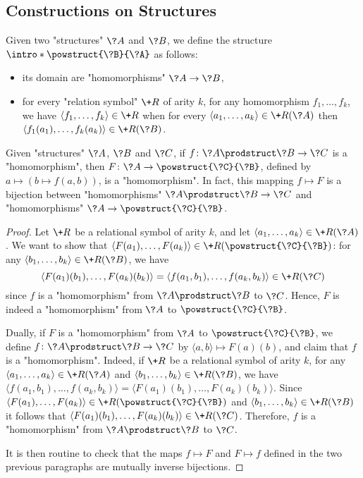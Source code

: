 \subsection{Constructions on Structures}

Given two "structures" $\?A$ and $\?B$, we define the structure \AP$\intro*\powstruct{\?B}{\?A}$ as follows:
\begin{itemize}
  \item its domain are "homomorphisms" $\?A \to \?B$,
  \item for every "relation symbol" $\+R$ of arity $k$, for any homomorphism $f_1,\hdots,f_k$,
  we have $\langle f_1,\hdots,f_k\rangle \in \+R$ when for every
  $\langle a_1,\hdots,a_k\rangle \in \+R(\?A)$
  then $\langle f_1(a_1), \hdots, f_k(a_k) \rangle \in \+R(\?B)$.
\end{itemize}


\begin{proposition}
	\AP\label{prop:currying-hom}
	Given "structures" $\?A$, $\?B$ and $\?C$, if $f\colon \?A\prodstruct \?B \to \?C$
	is a "homomorphism", then $F\colon \?A \to \powstruct{\?C}{\?B}$,
	defined by $a \mapsto (b \mapsto f(a,b))$, is a "homomorphism".
	In fact, this mapping $f \mapsto F$ is a bijection
	between "homomorphisms" $\?A\prodstruct \?B \to \?C$
	and "homomorphisms" $\?A \to \powstruct{\?C}{\?B}$.
\end{proposition}

\begin{proof}
Let $\+R$ be a relational symbol of arity $k$, and let
$\langle a_1,\hdots,a_k \rangle \in \+R(\?A)$.
We want to show that $\langle F(a_1),\hdots,F(a_k) \rangle \in \+R(\powstruct{\?C}{\?B})$:
for any $\langle b_1,\hdots,b_k \rangle \in \+R(\?B)$, we have
\[\langle F(a_1)(b_1), \hdots, F(a_k)(b_k)\rangle = \langle f(a_1,b_1),\hdots,f(a_k,b_k) \rangle \in \+R(\?C)\] since $f$ is a "homomorphism" from $\?A\prodstruct \?B$ to $\?C$.
Hence, $F$ is indeed a "homomorphism" from $\?A$ to $\powstruct{\?C}{\?B}$.

Dually, if $F$ is a "homomorphism" from $\?A$ to $\powstruct{\?C}{\?B}$,
we define $f\colon \?A\prodstruct \?B \to \?C$ by $\langle a,b \rangle \mapsto F(a)(b)$,
and claim that $f$ is a "homomorphism". Indeed, if $\+R$ be a relational symbol of arity $k$,
for any $\langle a_1, \hdots, a_k \rangle \in \+R(\?A)$
and $\langle b_1, \hdots, b_k \rangle \in \+R(\?B)$,
we have $\langle f(a_1,b_1), \hdots, f(a_k,b_k) \rangle
= \langle F(a_1)(b_1), \hdots, F(a_k)(b_k) \rangle$.
Since $\langle F(a_1), \hdots, F(a_k) \rangle \in \+R(\powstruct{\?C}{\?B})$
and $\langle b_1, \hdots,b_k \rangle \in \+R(\?B)$ 
it follows that $\langle F(a_1)(b_1), \hdots, F(a_k)(b_k) \rangle \in \+R(\?C)$.
Therefore, $f$ is a "homomorphism" from $\?A \prodstruct \?B$ to $\?C$.

It is then routine to check that the maps $f \mapsto F$ and $F \mapsto f$ defined
in the two previous paragraphs are mutually inverse bijections.
\end{proof}


